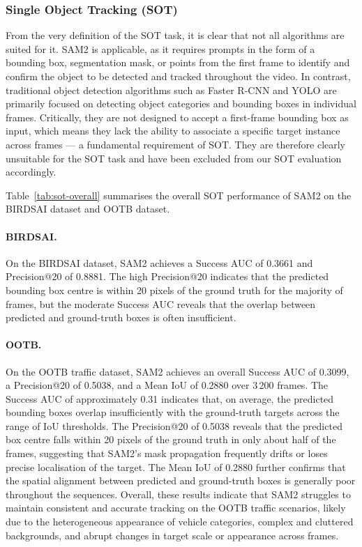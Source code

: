 \documentclass[11pt]{article}
\begin{document}
\hypertarget{Single Object Tracking (SOT)}{%
\subsubsection{Single Object Tracking (SOT)}\label{OP_SOT}}
From the very definition of the SOT task, it is clear that not all algorithms are suited for it. 
SAM2 is applicable, as it requires prompts in the form of a bounding box, segmentation mask, or points from the first frame to identify and confirm the object to be detected and tracked throughout the video. 
In contrast, traditional object detection algorithms such as Faster R-CNN and YOLO are primarily focused on detecting object categories and bounding boxes in individual frames. 
Critically, they are not designed to accept a first-frame bounding box as input, which means they lack the ability to associate a specific target instance across frames — a fundamental requirement of SOT. 
They are therefore clearly unsuitable for the SOT task and have been excluded from our SOT evaluation accordingly.

Table~\ref{tab:sot-overall} summarises the overall SOT performance of SAM2 on the 
BIRDSAI dataset and OOTB dataset.

\paragraph{BIRDSAI.}

On the BIRDSAI dataset, SAM2 achieves a Success AUC of 0.3661 and Precision@20 of 0.8881. 
The high Precision@20 indicates that the predicted bounding box centre is within 20 
pixels of the ground truth for the majority of frames, but the moderate Success AUC 
reveals that the overlap between predicted and ground-truth boxes is often insufficient.

\paragraph{OOTB.}
On the OOTB traffic dataset, SAM2 achieves an overall Success AUC of 0.3099, a Precision@20 of 0.5038, and a Mean IoU of 0.2880 over 3\,200 frames.
The Success AUC of approximately 0.31 indicates that, on average, the predicted bounding boxes overlap insufficiently with the ground-truth targets across the range of IoU thresholds.
The Precision@20 of 0.5038 reveals that the predicted box centre falls within 20 pixels of the ground truth in only about half of the frames, suggesting that SAM2's mask propagation frequently drifts or loses precise localisation of the target.
The Mean IoU of 0.2880 further confirms that the spatial alignment between predicted and ground-truth boxes is generally poor throughout the sequences.
Overall, these results indicate that SAM2 struggles to maintain consistent and accurate tracking on the OOTB traffic scenarios, likely due to the heterogeneous appearance of vehicle categories, complex and cluttered backgrounds, and abrupt changes in target scale or appearance across frames.
\end{document}

